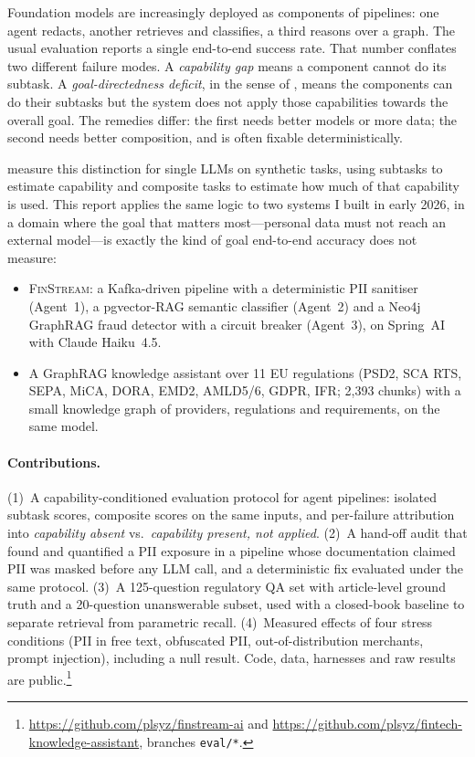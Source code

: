 \documentclass[10pt,twocolumn]{article}
\begin{document}
Foundation models are increasingly deployed as components of pipelines: one agent redacts, another retrieves and classifies, a third reasons over a graph. The usual evaluation reports a single end-to-end success rate. That number conflates two different failure modes. A \emph{capability gap} means a component cannot do its subtask. A \emph{goal-directedness deficit}, in the sense of \citet{everitt2025goal}, means the components can do their subtasks but the system does not apply those capabilities towards the overall goal. The remedies differ: the first needs better models or more data; the second needs better composition, and is often fixable deterministically.

\citet{everitt2025goal} measure this distinction for single LLMs on synthetic tasks, using subtasks to estimate capability and composite tasks to estimate how much of that capability is used. This report applies the same logic to two systems I built in early 2026, in a domain where the goal that matters most---personal data must not reach an external model---is exactly the kind of goal end-to-end accuracy does not measure:
\begin{itemize}\setlength\itemsep{1pt}
  \item \textsc{FinStream}: a Kafka-driven pipeline with a deterministic PII sanitiser (Agent~1), a pgvector-RAG semantic classifier (Agent~2) and a Neo4j GraphRAG fraud detector with a circuit breaker (Agent~3), on Spring~AI with Claude Haiku~4.5.
  \item A GraphRAG knowledge assistant over 11 EU regulations (PSD2, SCA RTS, SEPA, MiCA, DORA, EMD2, AMLD5/6, GDPR, IFR; 2{,}393 chunks) with a small knowledge graph of providers, regulations and requirements, on the same model.
\end{itemize}

\paragraph{Contributions.}
(1)~A capability-conditioned evaluation protocol for agent pipelines: isolated subtask scores, composite scores on the same inputs, and per-failure attribution into \emph{capability absent} vs.\ \emph{capability present, not applied}.
(2)~A hand-off audit that found and quantified a PII exposure in a pipeline whose documentation claimed PII was masked before any LLM call, and a deterministic fix evaluated under the same protocol.
(3)~A 125-question regulatory QA set with article-level ground truth and a 20-question unanswerable subset, used with a closed-book baseline to separate retrieval from parametric recall.
(4)~Measured effects of four stress conditions (PII in free text, obfuscated PII, out-of-distribution merchants, prompt injection), including a null result.
Code, data, harnesses and raw results are public.\footnote{\url{https://github.com/plsyz/finstream-ai} and \url{https://github.com/plsyz/fintech-knowledge-assistant}, branches \texttt{eval/*}.}
\end{document}
